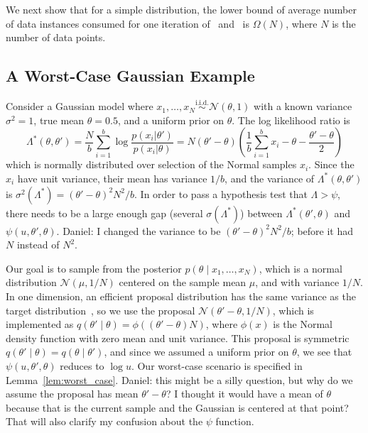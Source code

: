 \documentclass{article}
\newcommand{\simiid}{\overset{\textrm{i.i.d.}}{\sim}}
\begin{document}
We next show that for a simple distribution, the lower bound of average
number of data instances consumed for one iteration of~\cite{cutting_mh_2014}
and~\cite{icml2014c1_bardenet14} is $\Omega(N)$, where $N$ is the number of data
points.

\subsection{A Worst-Case Gaussian Example}\label{ssec:gaussian_example}
Consider a Gaussian model where $x_1,\ldots,x_N \simiid \mathcal{N}(\theta,1)$
with a known variance $\sigma^2=1$, true mean $\theta=0.5$, and a uniform prior
on $\theta$. The log likelihood ratio is
\begin{equation}
\Lambda^*(\theta,\theta') =  \frac{N}{b}\sum_{i=1}^b \log\frac{p(x_i|\theta')}{p(x_i|\theta)}=
  N(\theta'-\theta)\left(\frac{1}{b}\sum_{i=1}^b x_i-\theta-\frac{\theta'-\theta}{2}\right)
\end{equation}
which is normally distributed over selection of the Normal samples $x_i$.  Since
the $x_i$ have unit variance, their mean has variance $1/b$, and the variance of
$\Lambda^*(\theta,\theta')$ is $\sigma^2(\Lambda^*) = (\theta'-\theta)^2N^2/b$.
In order to pass a hypothesis test that $\Lambda > \psi$, there needs to be a
large enough gap (several $\sigma(\Lambda^*)$) between
$\Lambda^*(\theta',\theta)$ and $\psi(u,\theta',\theta)$. {\color{blue}
Daniel: I changed the variance to be $(\theta'-\theta)^2N^2/b$; before it had
$N$ instead of $N^2$.}

Our goal is to sample from the posterior $p(\theta \mid x_1,\ldots,x_N)$, which
is a normal distribution $\mathcal{N}(\mu, 1/N)$ centered on the sample mean
$\mu$, and with variance $1/N$. In one dimension, an efficient proposal
distribution has the same variance as the target
distribution~\cite{OptimalScaling01}, so we use the proposal
$\mathcal{N}(\theta'-\theta,1/N)$, which is implemented as
$q(\theta'\mid\theta)=\phi((\theta'-\theta)N)$, where $\phi(x)$ is the Normal
density function with zero mean and unit variance. This proposal is symmetric
$q(\theta'\mid\theta)=q(\theta\mid\theta')$, and since we assumed a uniform
prior on $\theta$, we see that $\psi(u,\theta',\theta)$ reduces to $\log u$. Our
worst-case scenario is specified in Lemma~\ref{lem:worst_case}.
{\color{blue} Daniel: this might be a silly question, but why do we assume the
proposal has mean $\theta'-\theta$? I thought it would have a mean of $\theta$
because that is the current sample and the Gaussian is centered at that point?
That will also clarify my confusion about the $\psi$ function.}
\end{document}
